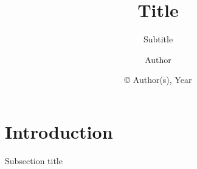 

\title{Title}
\subtitle{Subtitle}
\author{Author}
\date{\copyright{} Author(s), Year}


	\frame{\titlepage}
	\section{Introduction}
	\begin{namedframe}{Subsection title}
	\end{namedframe}

